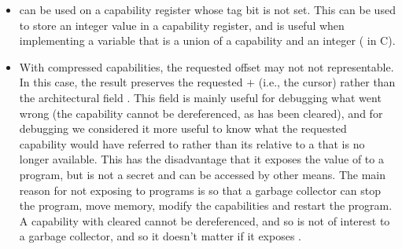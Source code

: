 \begin{itemize}
\item
{} can be used on a capability register whose tag bit
is not set. This can be used to store an integer value in a capability register,
and is useful when implementing a variable that is a union of a capability
and an integer ( in C).
\item
With compressed capabilities, the requested offset may not not
representable.
In this case, the result preserves the requested \cbase{} $+$ \coffset{}
(i.e., the cursor) rather than the architectural field \coffset{}. This
field is mainly useful for debugging what went wrong (the capability cannot
be dereferenced, as \ctag{} has been cleared), and for debugging we considered
it more useful to know what the requested capability would have referred to
rather than its \coffset{} relative to a \cbase{} that is no longer available.
This has the disadvantage that it exposes the value of \cbase{} to a program,
but \cbase{} is not a secret and can be accessed by other means. The
main reason for not exposing \cbase{} to programs is so that a garbage
collector can stop the program, move memory, modify the capabilities and
restart the program. A capability with \ctag{} cleared cannot be dereferenced,
and so is not of interest to a garbage collector, and so it doesn't matter
if it exposes \cbase{}.
\end{itemize}
